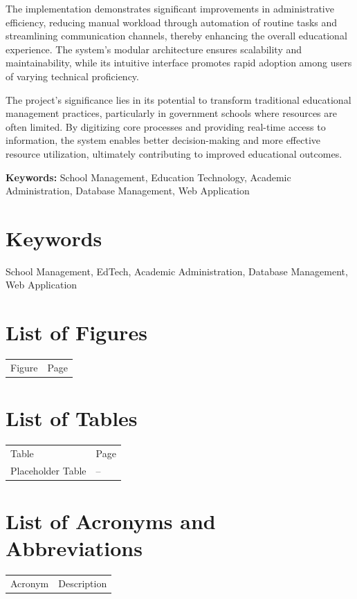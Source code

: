 \documentclass[12pt,a4paper]{report}
\begin{document}
The implementation demonstrates significant improvements in administrative efficiency, reducing manual workload through automation of routine tasks and streamlining communication channels, thereby enhancing the overall educational experience. The system's modular architecture ensures scalability and maintainability, while its intuitive interface promotes rapid adoption among users of varying technical proficiency.

The project's significance lies in its potential to transform traditional educational management practices, particularly in government schools where resources are often limited. By digitizing core processes and providing real-time access to information, the system enables better decision-making and more effective resource utilization, ultimately contributing to improved educational outcomes.

\textbf{Keywords:} School Management, Education Technology, Academic Administration, Database Management, Web Application

\newpage
\section*{Keywords}
School Management, EdTech, Academic Administration, Database Management, Web Application

\section*{List of Figures}
\begin{longtable}{p{}p{}}
    Figure & Page \\
\end{longtable}

\section*{List of Tables}
\begin{longtable}{p{}p{}}
    Table & Page \\
    Placeholder Table & -- \\
\end{longtable}

\section*{List of Acronyms and Abbreviations}
\begin{longtable}{p{}p{}}
    Acronym & Description \\
\end{longtable}
\end{document}

